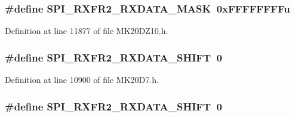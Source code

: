 \subsubsection[{\texorpdfstring{S\+P\+I\+\_\+\+R\+X\+F\+R2\+\_\+\+R\+X\+D\+A\+T\+A\+\_\+\+M\+A\+SK}{SPI_RXFR2_RXDATA_MASK}}]{\setlength{\rightskip}{0pt plus 5cm}\#define S\+P\+I\+\_\+\+R\+X\+F\+R2\+\_\+\+R\+X\+D\+A\+T\+A\+\_\+\+M\+A\+SK~0x\+F\+F\+F\+F\+F\+F\+F\+Fu}\hypertarget{group___s_p_i___register___masks_ga659737d6e82c6f3ace0e1d568157426f}{}\label{group___s_p_i___register___masks_ga659737d6e82c6f3ace0e1d568157426f}


Definition at line 11877 of file M\+K20\+D\+Z10.\+h.

\subsubsection[{\texorpdfstring{S\+P\+I\+\_\+\+R\+X\+F\+R2\+\_\+\+R\+X\+D\+A\+T\+A\+\_\+\+S\+H\+I\+FT}{SPI_RXFR2_RXDATA_SHIFT}}]{\setlength{\rightskip}{0pt plus 5cm}\#define S\+P\+I\+\_\+\+R\+X\+F\+R2\+\_\+\+R\+X\+D\+A\+T\+A\+\_\+\+S\+H\+I\+FT~0}\hypertarget{group___s_p_i___register___masks_gac8d903abae42a6b97dcbdc5bf31b1276}{}\label{group___s_p_i___register___masks_gac8d903abae42a6b97dcbdc5bf31b1276}


Definition at line 10900 of file M\+K20\+D7.\+h.

\subsubsection[{\texorpdfstring{S\+P\+I\+\_\+\+R\+X\+F\+R2\+\_\+\+R\+X\+D\+A\+T\+A\+\_\+\+S\+H\+I\+FT}{SPI_RXFR2_RXDATA_SHIFT}}]{\setlength{\rightskip}{0pt plus 5cm}\#define S\+P\+I\+\_\+\+R\+X\+F\+R2\+\_\+\+R\+X\+D\+A\+T\+A\+\_\+\+S\+H\+I\+FT~0}\hypertarget{group___s_p_i___register___masks_gac8d903abae42a6b97dcbdc5bf31b1276}{}\label{group___s_p_i___register___masks_gac8d903abae42a6b97dcbdc5bf31b1276}


